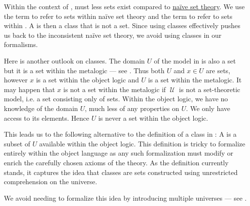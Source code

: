 \begin{remark}\label{rem:proper_class}
  Within the context of \hyperref[def:zfc]{}, must less sets exist compared to \hyperref[def:naive_set_theory]{na\"ive set theory}. We use the term  to refer to sets within na\"ive set theory and the term  to refer to sets within . A  is then a class that is not a set. Since using classes effectively pushes us back to the inconsistent na\"ive set theory, we avoid using classes in our formalisms.

  Here is another outlook on classes. The domain \( U \) of the model in  is also a set but it is a set within the metalogic --- see . Thus both \( U \) and \( x \in U \) are sets, however \( x \) is a set within the object logic and \( U \) is a set within the metalogic. It may happen that \( x \) is not a set within the metalogic if \( \mscrU \) is not a set-theoretic model, i.e. a set consisting only of sets. Within the object logic, we have no knowledge of the domain \( U \), much less of any properties on \( U \). We only have access to its elements. Hence \( U \) is never a set within the object logic.

  This leads us to the following alternative to the definition of a class in : A  is a subset of \( U \) available within the object logic. This definition is tricky to formalize entirely within the object language as any such formalization must modify or enrich the carefully chosen axioms of the theory. As the definition currently stands, it captures the idea that classes are sets constructed using unrestricted comprehension on the universe.

  We avoid needing to formalize this idea by introducing multiple universes --- see .
\end{remark}
